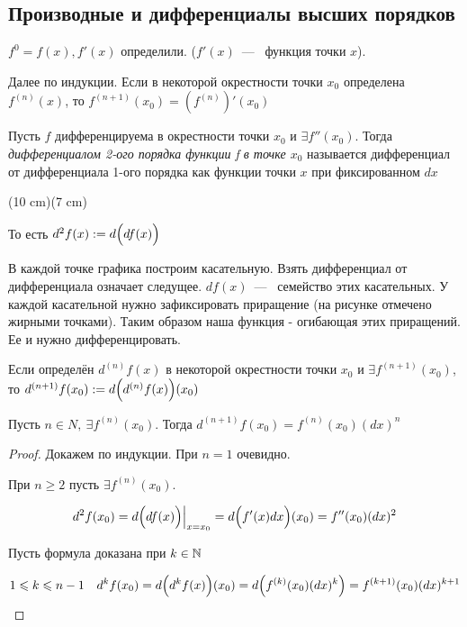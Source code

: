 \subsection{Производные и дифференциалы высших порядков}
\begin{definition}
    $f^{0} = f(x), f'(x)$ определили. ($f'(x)$~---~ функция точки $x$).

    Далее по индукции. Если в некоторой окрестности точки $x_{0}$ определена $f^{(n)}(x)$, то $f^{(n+1)} (x_{0}) = \left(f^{(n)}\right)'(x_{0})$
\end{definition}

\begin{definition}
    Пусть $f$ дифференцируема в окрестности точки $x_{0}$ и $\exists f''(x_{0})$. Тогда \textit{дифференциалом 2-ого порядка функции f в точке $x_{0}$} называется дифференциал от дифференциала 1-ого порядка как функции точки $x$ при фиксированном $dx$
\end{definition}

\sidefig(10 cm)(7 cm)
{
\begin{flushleft}
То есть $d^2 f(x) := d\Bigl(df(x)\Bigr)$

В каждой точке графика построим касательную. Взять дифференциал от дифференциала означает следущее. $df(x)$~---~ семейство этих касательных. У каждой касательной нужно зафиксировать приращение (на рисунке отмечено жирными точками). Таким образом наша функция - огибающая этих приращений. Ее и нужно дифференцировать.
\end{flushleft}
}
{

}


    

\begin{definition}
    Если определён $d^{(n)}f(x)$ в некоторой окрестности точки $x_{0}$ и $\exists f^{(n+1)}(x_{0})$, то $d^{(n+1)} f(x_{0}) :=  d\Bigl(d^{(n)}f(x)\Bigr)(x_{0})$
\end{definition}

\begin{theorem}
    Пусть $n\in N, \ \exists f^{(n)}(x_{0})$. Тогда  $d^{(n+1)} f(x_{0}) = f^{(n)}(x_{0}) (dx)^{n}$ 
\end{theorem}
\begin{proof}
    Докажем по индукции. При $n = 1$ очевидно.

    При $n \geq 2$ пусть $\exists f^{(n)}(x_{0})$.

    $$
    d^{2} f(x_{0}) = d\Bigl(df(x)\Bigr) \Bigr|_{x = x_{0}} = d\Bigl(f'(x)dx\Bigr)(x_{0}) = f''(x_{0})(dx)^{2}
    $$

    Пусть формула доказана при $k \in \N$

    $$
    1 \leq k\leq n-1 \quad d^{k} f(x_{0}) = d\Bigl(d^{k} f(x)\Bigr)(x_{0}) = d\Bigl(f^{(k)}(x_{0}) (dx)^{k}\Bigr) = f^{(k +1)}(x_{0})(dx)^{k+1}
    $$
    
\end{proof}